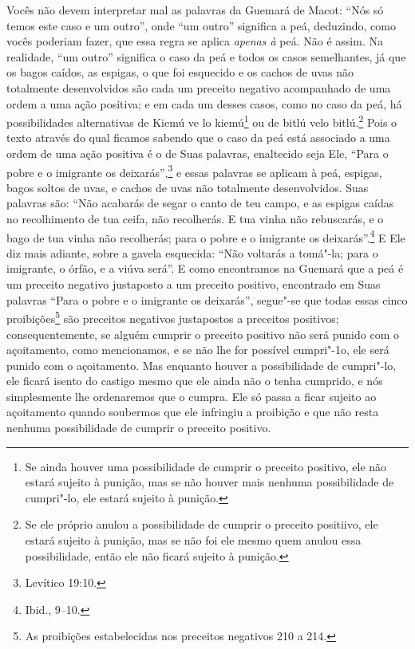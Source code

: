 \begin{multicols}{2}
Vocês não devem interpretar mal as palavras da Guemará\starr{} de Macot\starr: ``Nós
só temos este caso e um outro'', onde ``um outro'' significa a peá\starr,
deduzindo, como vocês poderiam fazer, que essa regra se aplica
\emph{apenas à} peá\starr. Não é assim. Na realidade, ``um outro''
significa o caso da peá\starr{} e todos os casos semelhantes, já que os
bagos caídos, as espigas, o que foi esquecido e os cachos de uvas não
totalmente desenvolvidos são cada um preceito negativo acompanhado de
uma ordem a uma ação positiva; e em cada um desses casos, como no caso
da peá\starr, há possibilidades alternativas de Kiemú ve lo kiemú\starr\footnote{Se ainda houver uma possibilidade de cumprir o preceito positivo, ele
  não estará sujeito à punição, mas se não houver mais nenhuma
  possibilidade de cumpri"-lo, ele estará sujeito à punição.} ou de bitlú velo bitlú\starr.\footnote{Se ele próprio anulou a possibilidade de cumprir o preceito
  positiivo, ele estará sujeito à punição, mas se não foi ele mesmo
  quem anulou essa possibilidade, então ele não ficará sujeito à
  punição.} Pois o texto através do qual ficamos
sabendo que o caso da peá\starr{} está associado a uma ordem de uma ação
positiva é o de Suas palavras, enaltecido seja Ele, ``Para o pobre e o
imigrante os deixarás'',\footnote{Levítico 19:10.} e essas palavras se aplicam à
peá\starr, espigas, bagos soltos de uvas, e cachos de uvas não totalmente
desenvolvidos. Suas palavras são: ``Não acabarás de segar o canto de teu
campo, e as espigas caídas no recolhimento de tua ceifa, não recolherás.
E tua vinha não rebuscarás, e o bago de tua vinha não recolherás; para
o pobre e o imigrante os deixarás''.\footnote{Ibid., 9--10.} E Ele diz mais
adiante, sobre a gavela esquecida: ``Não voltarás a tomá"-la; para o
imigrante, o órfão, e a viúva será''. E como encontramos na Guemará\starr{} que
a peá\starr{} é um preceito negativo justaposto a um preceito positivo,
encontrado em Suas palavras ``Para o pobre e o imigrante os deixarás'',
segue"-se que todas essas cinco proibições\footnote{As proibições estabelecidas nos preceitos negativos 210 a 214.} são
preceitos negativos justapostos a preceitos positivos;
consequentemente, se alguém cumprir o preceito positivo não será punido
com o açoitamento, como mencionamos, e se não lhe for possível
cumpri"-1o, ele será punido com o açoitamento. Mas enquanto houver a
possibilidade de cumpri"-lo, ele ficará isento do castigo mesmo que ele
ainda não o tenha cumprido, e nós simplesmente lhe ordenaremos que o
cumpra. Ele só passa a ficar sujeito ao açoitamento quando soubermos
que ele infringiu a proibição e que não resta nenhuma possibilidade de
cumprir o preceito positivo.


\end{multicols}
